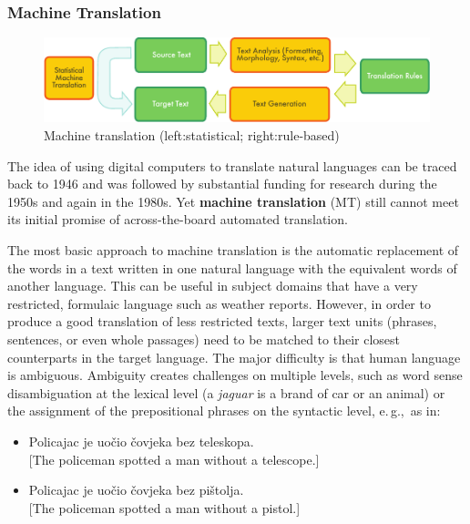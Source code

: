 \begin{multicols}{2}
\subsubsection{Machine Translation}

\begin{figure}[htb]
  \center
  \includegraphics[width=\textwidth]{../_media/english/machine_translation}
  \caption{Machine translation (left:statistical; right:rule-based)}
  \label{fig:mtarch_en}
\end{figure}

The idea of using digital computers to translate natural languages can be traced back to 1946 and was followed by substantial funding for research during the 1950s and again in the 1980s. Yet \textbf{machine translation} (MT) still cannot meet its initial promise of across-the-board automated translation.
 

The most basic approach to machine translation is the automatic replacement of the words in a text written in one natural language with the equivalent words of another language. This can be useful in subject domains that have a very restricted, formulaic language such as weather reports. However, in order to produce a good translation of less restricted texts, larger text units (phrases, sentences, or even whole passages) need to be matched to their closest counterparts in the target language. The major difficulty is that human language is ambiguous. Ambiguity creates challenges on multiple levels, such as word sense disambiguation at the lexical level (a \emph{jaguar} is a brand of car or an animal) or the assignment of the prepositional phrases on the syntactic level, e.\,g.,~as in:

\begin{itemize}
\item Policajac je uočio čovjeka bez teleskopa.\\
  {[}The policeman spotted a man without a telescope.{]} 
\item Policajac je uočio čovjeka bez pištolja.\\
  {[}The policeman spotted a man without a pistol.{]}
\end{itemize}


\end{multicols}
